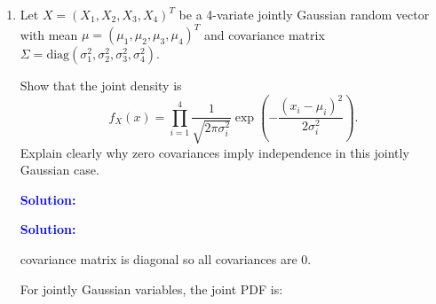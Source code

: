 \documentclass[11pt]{article}
\newcommand{\solution}{
    \vspace{0.3cm}
    \noindent\textbf{\textcolor{blue}{Solution:}}
    \vspace{0.3cm}
}
\begin{document}
\begin{enumerate}[label=\textbf{Question-\arabic*:}, leftmargin=*]
\[\[The joint PDF of a multivariate Gaussian is:

\[
f(x_1,x_2,x_3)
=
\frac{1}{(2\pi)^{3/2}|\Sigma|^{1/2}}
\exp\left(
-\frac{1}{2}(x-\mu)^T \Sigma^{-1} (x-\mu)
\right)
\]

Since $\Sigma$ is diagonal,

\[
|\Sigma| = \sigma_1^2 \sigma_2^2 \sigma_3^2
\]

and

\[
\Sigma^{-1} =
\begin{bmatrix}
\frac{1}{\sigma_1^2} & 0 & 0\\
0 & \frac{1}{\sigma_2^2} & 0\\
0 & 0 & \frac{1}{\sigma_3^2}
\end{bmatrix}
\]

So the exponent becomes:

\[
-\frac{(x_1-\mu_1)^2}{2\sigma_1^2}
-\frac{(x_2-\mu_2)^2}{2\sigma_2^2}
-\frac{(x_3-\mu_3)^2}{2\sigma_3^2}
\]

Thus,

\[
f(x_1,x_2,x_3)
=
\frac{1}{(2\pi)^{3/2}\sigma_1\sigma_2\sigma_3}
\exp\left(
-\frac{(x_1-\mu_1)^2}{2\sigma_1^2}
\right)
\exp\left(
-\frac{(x_2-\mu_2)^2}{2\sigma_2^2}
\right)
\exp\left(
-\frac{(x_3-\mu_3)^2}{2\sigma_3^2}
\right)
\]

\[
= f_{X_1}(x_1)\; f_{X_2}(x_2)\; f_{X_3}(x_3)
\]

Hence, the joint PDF factors into the product of marginal PDFs.

\[
\Rightarrow \boxed{X_1, X_2, X_3 \text{ are independent}}
\]

\newpage

\item Let $X = (X_1, X_2, X_3, X_4)^T$ be a 4-variate jointly Gaussian random vector with mean $\mu = (\mu_1,\mu_2,\mu_3,\mu_4)^T$ and covariance matrix $\Sigma = \mathrm{diag}(\sigma_1^2,\sigma_2^2,\sigma_3^2,\sigma_4^2)$.

Show that the joint density is
\[
f_X(x) = \prod_{i=1}^{4}
\frac{1}{\sqrt{2\pi\sigma_i^2}}
\exp\!\left(-\frac{(x_i-\mu_i)^2}{2\sigma_i^2}\right).
\]
Explain clearly why zero covariances imply independence in this jointly Gaussian case.

\solution

\solution

 covariance matrix is diagonal so all covariances are 0.

For jointly Gaussian variables, the joint PDF is:

\]\]
\end{enumerate}
\end{document}
